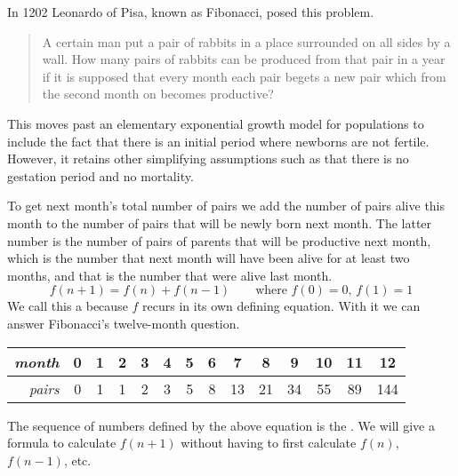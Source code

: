 
In 1202 Leonardo of Pisa, known as Fibonacci, posed this problem.
\begin{quotation}
  \noindent A certain man put a pair of rabbits in a place 
  surrounded on all sides by a wall.
  How many pairs of rabbits can be produced from that pair in a year if it
  is supposed that every month each pair begets a new pair which from the 
  second month on becomes productive? 
\end{quotation}
This moves past an elementary exponential growth model for
populations
to include the fact that there is an initial period where 
newborns are not fertile.
However, it retains other simplifying assumptions such as  
that there is no gestation period and no mortality.

To get next month's total number of pairs 
we add the number of pairs alive this month to
the number of pairs that will be newly born next month.
The latter number is the number of pairs of parents that will be 
productive next month, which is the number that next month will 
have been alive for at least two months,
and that is the number that were alive last month.
\begin{equation*}
  f(n+1)=f(n)+f(n-1)  \qquad \text{where $f(0)=0$, $f(1)=1$}
\end{equation*}
We call this a 
because $f$ recurs in its own defining equation.
With it we can answer Fibonacci's twelve-month question.
\begin{center}
  \begin{tabular}{r|ccccccccccccc}
    \textit{month}
     &0  &1  &2  &3  &4  &5  &6  &7  &8  &9  &10  &11  &12  \\ \hline
    \textit{pairs}
     &0  &1  &1  &2  &3  &5  &8  &13  &21  &34  &55  &89  &144   
  \end{tabular}
\end{center}
The sequence of numbers defined by the above equation is the 
.
We will give a formula to
calculate $f(n+1)$ without having to first calculate $f(n)$, $f(n-1)$, etc.

